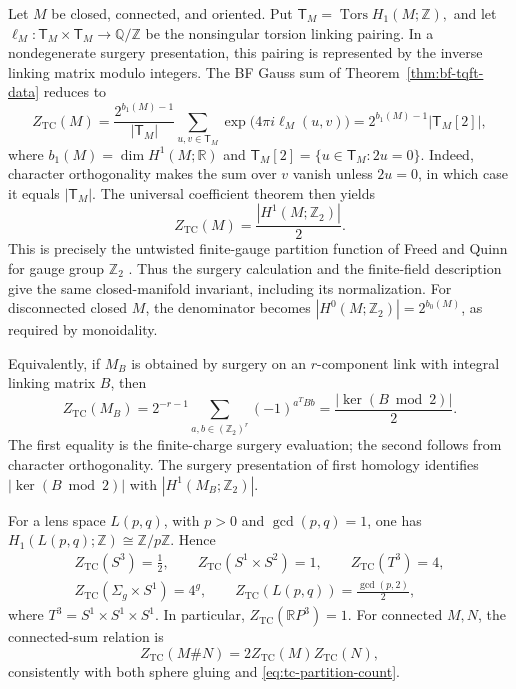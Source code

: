 \documentclass[12pt]{amsart}
\numberwithin{equation}{section}
\theoremstyle{definition}
\begin{document}
Let $M$ be closed, connected, and oriented. Put $\mathsf T_M=\operatorname{Tors}H_1(M;\mathbb Z),$ and let
$\ell_M:\mathsf T_M\times\mathsf T_M\to\mathbb Q/\mathbb Z$
be the nonsingular torsion linking pairing.
In a nondegenerate surgery presentation, this pairing is represented
by the inverse linking matrix modulo integers.
The BF Gauss sum of Theorem~\ref{thm:bf-tqft-data} reduces to
\begin{equation}
\label{eq:tc-partition-gauss}
Z_{\mathrm{TC}}(M)
=
\frac{2^{b_1(M)-1}}{|\mathsf T_M|}
\sum_{u,v\in\mathsf T_M}
\exp\!\bigl(4\pi i\ell_M(u,v)\bigr)
=
2^{b_1(M)-1}|\mathsf T_M[2]|,
\end{equation}
where
$b_1(M)=\dim H^1(M;\mathbb R)$ and
$\mathsf T_M[2]=\{u\in\mathsf T_M:2u=0\}$.
Indeed, character orthogonality makes the sum over $v$ vanish
unless $2u=0$, in which case it equals $|\mathsf T_M|$.
The universal coefficient theorem then yields
\begin{equation}
\label{eq:tc-partition-count}
Z_{\mathrm{TC}}(M)
=
\frac{|H^1(M;\mathbb Z_2)|}{2}.
\end{equation}
This is precisely the untwisted finite-gauge partition function
of Freed and Quinn for gauge group $\mathbb Z_2$
\cite[Eq.~(5.14)]{Freed:1991}.
Thus the surgery calculation and the finite-field description give
the same closed-manifold invariant, including its normalization.
For disconnected closed $M$, the denominator becomes
$|H^0(M;\mathbb Z_2)|=2^{b_0(M)}$, as required by monoidality.

Equivalently, if $M_B$ is obtained by surgery on an $r$-component
link with integral linking matrix $B$, then
\begin{equation}
\label{eq:tc-surgery-mod-two}
Z_{\mathrm{TC}}(M_B)
=
2^{-r-1}
\sum_{a,b\in(\mathbb Z_2)^r}
(-1)^{a^TBb}
=
\frac{|\ker(B\bmod2)|}{2}.
\end{equation}
The first equality is the finite-charge surgery evaluation; the
second follows from character orthogonality.
The surgery presentation of first homology identifies
$|\ker(B\bmod2)|$ with $|H^1(M_B;\mathbb Z_2)|$.

For a lens space $L(p,q)$, with $p>0$ and $\gcd(p,q)=1$,
one has $H_1(L(p,q);\mathbb Z)\cong\mathbb Z/p\mathbb Z$.
Hence
\begin{equation}
\label{eq:tc-partition-examples}
\begin{gathered}
Z_{\mathrm{TC}}(S^3)=\tfrac12,
\qquad
Z_{\mathrm{TC}}(S^1\times S^2)=1,
\qquad
Z_{\mathrm{TC}}(T^3)=4,
\\
Z_{\mathrm{TC}}(\Sigma_g\times S^1)=4^g,
\qquad
Z_{\mathrm{TC}}(L(p,q))
=\frac{\gcd(p,2)}2,
\end{gathered}
\end{equation}
where $T^3=S^1\times S^1\times S^1$.
In particular, $Z_{\mathrm{TC}}(\mathbb RP^3)=1$.
For connected $M,N$, the connected-sum relation is
$$
Z_{\mathrm{TC}}(M\#N)
=
2Z_{\mathrm{TC}}(M)Z_{\mathrm{TC}}(N),
$$
consistently with both sphere gluing and
\eqref{eq:tc-partition-count}.
\end{document}
